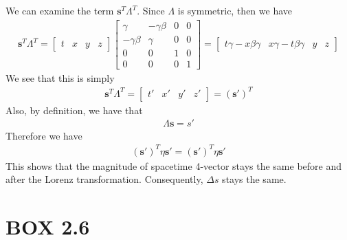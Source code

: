 \documentclass[12pt]{memoir}
\newcommand{\paren}[1]{\left( #1 \right)}
\begin{document}
We can examine the term $\mathbf{s}^T\Lambda^T$. Since $\Lambda$ is symmetric, then we have 
\begin{align}
\mathbf{s}^T\Lambda^T = \begin{bmatrix}
    t&x&y&z
\end{bmatrix}\begin{bmatrix}
\gamma & -\gamma\beta & 0 & 0 \\
-\gamma\beta & \gamma & 0 & 0 \\
0 & 0 & 1 & 0 \\
0 & 0 & 0 & 1
\end{bmatrix} = \left[\begin{matrix}
t\gamma-x\beta\gamma & x\gamma-t\beta\gamma & y & z
\end{matrix}\right]
\end{align}
We see that this is simply
\begin{align}
\mathbf{s}^T\Lambda^T = \left[\begin{matrix}
t' & x' & y' & z'
\end{matrix}\right] = \paren{\mathbf{s}'}^T
\end{align}
Also, by definition, we have that
\begin{align}
\Lambda\mathbf{s} = s'
\end{align}
Therefore we have
\begin{align}
\paren{\mathbf{s}'}^T\eta\mathbf{s}' = \paren{\mathbf{s}'}^T\eta\mathbf{s}'
\end{align}
This shows that the magnitude of spacetime 4-vector stays the same before and after the Lorenz transformation. Consequently, $\Delta s$ stays the same. 

\section{BOX 2.6}
\end{document}
